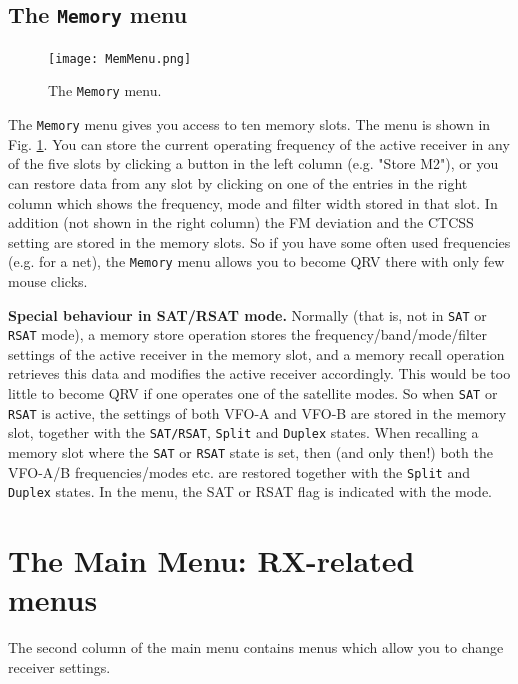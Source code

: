 \documentclass[12pt]{book}
\def\bltt#1{\texttt{\color{blue}#1}}
\begin{document}
\section{The \texttt{Memory}  menu}
\label{sec:memmenu}

\begin{figure}[ht]
\center
\texttt{[image: MemMenu.png]}
\caption{The \bltt{Memory} menu.}
\label{fig:MemMenu}
\end{figure}

The \bltt{Memory} menu gives you access to ten memory slots. The menu is shown in Fig. \ref{fig:MemMenu}.
You can store the current
operating frequency  of the active receiver in any of the five slots by clicking a
button in the left column (e.g. "Store M2"), or you can restore
data from any slot by clicking on one of the entries in the right column
which shows the frequency, mode and filter width stored in that slot.
In addition (not shown in the right column) the FM deviation and the CTCSS setting are stored
in the memory slots.
So if you have some often used frequencies (e.g. for a net), the
\bltt{Memory} menu allows you to become QRV there with only few mouse clicks.

\textbf{Special behaviour in SAT/RSAT mode.} Normally (that is, not in \bltt{SAT} or \bltt{RSAT} mode), a memory store
operation stores the frequency/band/mode/filter settings of the active receiver in the memory slot,
and a memory recall operation retrieves this data and modifies the active receiver accordingly. This would be
too little to become QRV if one operates one of the satellite  modes. So when \bltt{SAT} or \bltt{RSAT} is
active, the settings of both VFO-A and VFO-B are stored in the memory slot, together with the
\bltt{SAT/RSAT}, \bltt{Split}
and \bltt{Duplex} states. When recalling a memory slot where the \bltt{SAT} or \bltt{RSAT} state is set, then
(and only then!) both
the VFO-A/B frequencies/modes etc. are restored together with the \bltt{Split} and \bltt{Duplex} states. In the menu,
the SAT or RSAT flag is indicated with the mode.
\chapter[RX-related menus]{The Main Menu: RX-related menus}

The second column of the main menu contains menus which allow you to change
receiver settings.
\end{document}
